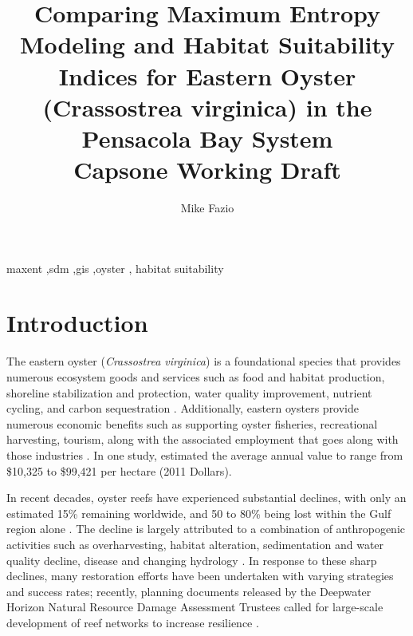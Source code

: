 \documentclass[
  review]{elsarticle}
\begin{document}
\begin{frontmatter}
\title{Comparing Maximum Entropy Modeling and Habitat Suitability
Indices for Eastern Oyster (Crassostrea virginica) in the Pensacola Bay
System \\\large{Capsone Working Draft} }
\author[1]{Mike Fazio%
%
}


        





\begin{keyword}
    maxent \sep sdm \sep gis \sep oyster \sep 
    habitat suitability
\end{keyword}
\end{frontmatter}
    

\section{Introduction}\label{introduction}

The eastern oyster (\emph{Crassostrea virginica}) is a foundational
species that provides numerous ecosystem goods and services such as food
and habitat production, shoreline stabilization and protection, water
quality improvement, nutrient cycling, and carbon sequestration
\citep{Geselbracht2024, Grabowski2012, Barnes2007}. Additionally,
eastern oysters provide numerous economic benefits such as supporting
oyster fisheries, recreational harvesting, tourism, along with the
associated employment that goes along with those industries
\citep{Geselbracht2024, LaPeyre2021}. In one study,
\citet{Grabowski2012} estimated the average annual value to range from
\$10,325 to \$99,421 per hectare (2011 Dollars).

In recent decades, oyster reefs have experienced substantial declines,
with only an estimated 15\% remaining worldwide, and 50 to 80\% being
lost within the Gulf region alone \citep{Pollack2012, LaPeyre2021}. The
decline is largely attributed to a combination of anthropogenic
activities such as overharvesting, habitat alteration, sedimentation and
water quality decline, disease and changing hydrology
\citep{LaPeyre2021, Geselbracht2024}. In response to these sharp
declines, many restoration efforts have been undertaken with varying
strategies and success rates; recently, planning documents released by
the Deepwater Horizon Natural Resource Damage Assessment Trustees called
for large-scale development of reef networks to increase resilience
\citep{Geselbracht2024}.
\end{document}
